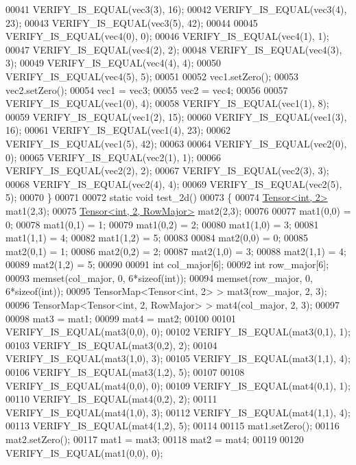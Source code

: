 \begin{DoxyCode}
00041   VERIFY\_IS\_EQUAL(vec3(3), 16);
00042   VERIFY\_IS\_EQUAL(vec3(4), 23);
00043   VERIFY\_IS\_EQUAL(vec3(5), 42);
00044 
00045   VERIFY\_IS\_EQUAL(vec4(0), 0);
00046   VERIFY\_IS\_EQUAL(vec4(1), 1);
00047   VERIFY\_IS\_EQUAL(vec4(2), 2);
00048   VERIFY\_IS\_EQUAL(vec4(3), 3);
00049   VERIFY\_IS\_EQUAL(vec4(4), 4);
00050   VERIFY\_IS\_EQUAL(vec4(5), 5);
00051 
00052   vec1.setZero();
00053   vec2.setZero();
00054   vec1 = vec3;
00055   vec2 = vec4;
00056 
00057   VERIFY\_IS\_EQUAL(vec1(0), 4);
00058   VERIFY\_IS\_EQUAL(vec1(1), 8);
00059   VERIFY\_IS\_EQUAL(vec1(2), 15);
00060   VERIFY\_IS\_EQUAL(vec1(3), 16);
00061   VERIFY\_IS\_EQUAL(vec1(4), 23);
00062   VERIFY\_IS\_EQUAL(vec1(5), 42);
00063 
00064   VERIFY\_IS\_EQUAL(vec2(0), 0);
00065   VERIFY\_IS\_EQUAL(vec2(1), 1);
00066   VERIFY\_IS\_EQUAL(vec2(2), 2);
00067   VERIFY\_IS\_EQUAL(vec2(3), 3);
00068   VERIFY\_IS\_EQUAL(vec2(4), 4);
00069   VERIFY\_IS\_EQUAL(vec2(5), 5);
00070 \}
00071 
00072 \textcolor{keyword}{static} \textcolor{keywordtype}{void} test\_2d()
00073 \{
00074   \hyperlink{class_eigen_1_1_tensor}{Tensor<int, 2>} mat1(2,3);
00075   \hyperlink{class_eigen_1_1_tensor}{Tensor<int, 2, RowMajor>} mat2(2,3);
00076 
00077   mat1(0,0) = 0;
00078   mat1(0,1) = 1;
00079   mat1(0,2) = 2;
00080   mat1(1,0) = 3;
00081   mat1(1,1) = 4;
00082   mat1(1,2) = 5;
00083 
00084   mat2(0,0) = 0;
00085   mat2(0,1) = 1;
00086   mat2(0,2) = 2;
00087   mat2(1,0) = 3;
00088   mat2(1,1) = 4;
00089   mat2(1,2) = 5;
00090 
00091   \textcolor{keywordtype}{int} col\_major[6];
00092   \textcolor{keywordtype}{int} row\_major[6];
00093   memset(col\_major, 0, 6*\textcolor{keyword}{sizeof}(\textcolor{keywordtype}{int}));
00094   memset(row\_major, 0, 6*\textcolor{keyword}{sizeof}(\textcolor{keywordtype}{int}));
00095   TensorMap<Tensor<int, 2> > mat3(row\_major, 2, 3);
00096   TensorMap<Tensor<int, 2, RowMajor> > mat4(col\_major, 2, 3);
00097 
00098   mat3 = mat1;
00099   mat4 = mat2;
00100 
00101   VERIFY\_IS\_EQUAL(mat3(0,0), 0);
00102   VERIFY\_IS\_EQUAL(mat3(0,1), 1);
00103   VERIFY\_IS\_EQUAL(mat3(0,2), 2);
00104   VERIFY\_IS\_EQUAL(mat3(1,0), 3);
00105   VERIFY\_IS\_EQUAL(mat3(1,1), 4);
00106   VERIFY\_IS\_EQUAL(mat3(1,2), 5);
00107 
00108   VERIFY\_IS\_EQUAL(mat4(0,0), 0);
00109   VERIFY\_IS\_EQUAL(mat4(0,1), 1);
00110   VERIFY\_IS\_EQUAL(mat4(0,2), 2);
00111   VERIFY\_IS\_EQUAL(mat4(1,0), 3);
00112   VERIFY\_IS\_EQUAL(mat4(1,1), 4);
00113   VERIFY\_IS\_EQUAL(mat4(1,2), 5);
00114 
00115   mat1.setZero();
00116   mat2.setZero();
00117   mat1 = mat3;
00118   mat2 = mat4;
00119 
00120   VERIFY\_IS\_EQUAL(mat1(0,0), 0);

\end{DoxyCode}
